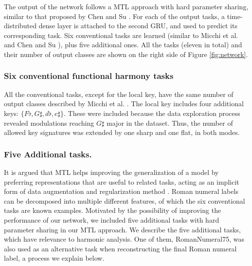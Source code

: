 The output of the network follows a MTL approach with hard parameter sharing, similar to that proposed by Chen and Su \cite{chen_functional_2018}. For each of the output tasks, a time-distributed dense layer is attached to the second GRU, and used to predict its corresponding task. 
Six conventional tasks are learned (similar to Micchi et al. and Chen and Su \cite{micchi_not_2020, chen_attend_2021}), plus five additional ones. All the tasks (eleven in total) and their number of output classes are shown on the right side of Figure \ref{fig:network}.

\subsubsection{Six conventional functional harmony tasks}
All the conventional tasks, except for the local key, have the same number of output classes described by Micchi et al. \cite{micchi_not_2020}. The local key includes four additional keys: $\{F\flat, G\sharp, d\flat, e\sharp\}$. These were included because the data exploration process revealed modulations reaching $G\sharp$ major in the dataset.
Thus, the number of allowed key signatures was extended by one sharp and one flat, in both modes.

\subsubsection{Five Additional tasks.}\label{sec:additionaltasks}

It is argued that MTL helps improving the generalization of a model by preferring representations that are useful to related tasks, acting as an implicit form of data augmentation and regularization method \cite{ruder_overview_2017}.
Roman numeral labels can be decomposed into multiple different features, of which the six conventional tasks are known examples.
Motivated by the possibility of improving the performance of our network, we included five additional tasks with hard parameter sharing in our MTL approach.
We describe the five additional tasks, which have relevance to harmonic analysis. 
One of them, RomanNumeral75, was also used as an alternative task when reconstructing the final Roman numeral label, a process we explain below.

